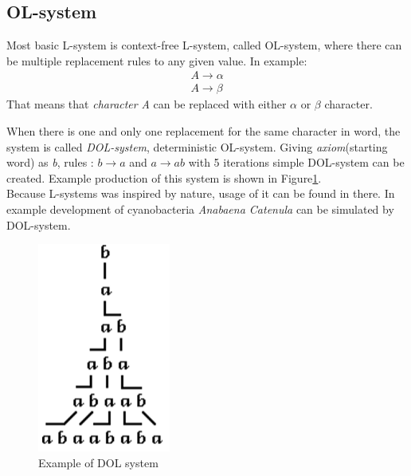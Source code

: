 \documentclass[b5paper,twoside,11pt]{article}
\renewcommand{\figurename}{Figure}
\begin{document}
\subsection{OL-system}
Most basic L-system is context-free L-system, called OL-system, where there can be multiple replacement rules to any given value. In example:
\begin{equation}
\begin{aligned}
A \longrightarrow \alpha \\
A \longrightarrow \beta
\end{aligned}
\end{equation}
That means that \textit{character} \textit{A} can be replaced with either $\alpha$ or $\beta$ character.\\
\par When there is one and only one replacement for the same character in word, the system is called \textit{DOL-system}, deterministic OL-system.
Giving \textit{axiom}(starting word) as \textit{b}, rules : $b \rightarrow a$ and $a \rightarrow ab$ with 5 iterations simple DOL-system can be created. Example production of this system is shown in \figurename\ref{DOL}.\\
Because L-systems was inspired by nature, usage of it can be found in there. In example  development of cyanobacteria \textit{Anabaena Catenula} can be simulated by DOL-system.
\begin{figure}[!htp]
\centering
  \includegraphics[width=0.15\linewidth]{DOL-system}
\caption{Example of DOL system\cite{prusinABOP} \label{DOL}}
\end{figure}
\end{document}
